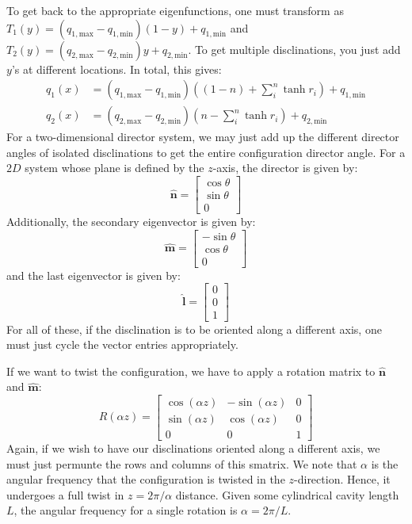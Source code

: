\documentclass[reqno]{article}
\newcommand{\n}{\hat{\mathbf{n}}}
\newcommand{\m}{\hat{\mathbf{m}}}
\newcommand{\boldl}{\hat{\mathbf{l}}}
\begin{document}
To get back to the appropriate eigenfunctions, one must transform as $T_1(y) = (q_{1, \text{max}} - q_{1, \text{min}})(1 - y) + q_{1, \text{min}}$ and $T_2(y) = (q_{2, \text{max}} - q_{2, \text{min}}) y + q_{2, \text{min}}$.
To get multiple disclinations, you just add $y$'s at different locations.
In total, this gives:
\begin{align}
    q_1(x) 
    &= 
    (q_{1, \text{max}} - q_{1, \text{min}})\left((1 - n) + \sum_i^n \tanh r_i \right) + q_{1, \text{min}}  \\
    q_2(x)
    &=
    (q_{2, \text{max}} - q_{2, \text{min}}) \left( n - \sum_i^n \tanh r_i \right) + q_{2, \text{min}}
\end{align}
For a two-dimensional director system, we may just add up the different director angles of isolated disclinations to get the entire configuration director angle.
For a $2D$ system whose plane is defined by the $z$-axis, the director is given by:
\begin{equation}
    \n
    =
    \begin{bmatrix}
        \cos\theta \\
        \sin\theta \\
        0
    \end{bmatrix}
\end{equation}
Additionally, the secondary eigenvector is given by:
\begin{equation}
    \m
    =
    \begin{bmatrix}
        -\sin\theta \\
        \cos\theta \\
        0
    \end{bmatrix}
\end{equation}
and the last eigenvector is given by:
\begin{equation}
    \boldl
    =
    \begin{bmatrix}
        0 \\
        0 \\
        1
    \end{bmatrix}
\end{equation}
For all of these, if the disclination is to be oriented along a different axis, one must just cycle the vector entries appropriately.

If we want to twist the configuration, we have to apply a rotation matrix to $\n$ and $\m$:
\begin{equation}
    R(\alpha z)
    =
    \begin{bmatrix}
        \cos(\alpha z) &-\sin(\alpha z) &0 \\
        \sin(\alpha z) &\cos(\alpha z) &0 \\
        0 &0 &1
    \end{bmatrix}
\end{equation}
Again, if we wish to have our disclinations oriented along a different axis, we must just permunte the rows and columns of this smatrix.
We note that $\alpha$ is the angular frequency that the configuration is twisted in the $z$-direction.
Hence, it undergoes a full twist in $z = 2\pi / \alpha$ distance.
Given some cylindrical cavity length $L$, the angular frequency for a single rotation is $\alpha = 2 \pi / L$.
\end{document}
